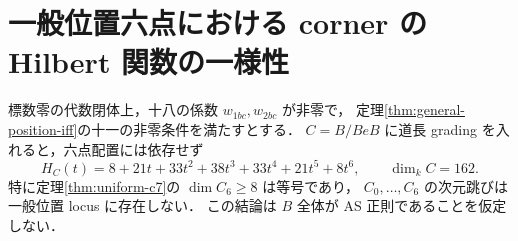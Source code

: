 \section{一般位置六点における corner の Hilbert 関数の一様性}
\label{sec:hilbert-constant}
\begin{theorem}\label{thm:hilbert-constant}
標数零の代数閉体上，十八の係数 $w_{1bc},w_{2bc}$ が非零で，
定理\ref{thm:general-position-iff}の十一の非零条件を満たすとする．
$C=B/BeB$ に道長 grading を入れると，六点配置には依存せず
\[
 \boxed{H_C(t)=8+21t+33t^2+38t^3+33t^4+21t^5+8t^6,\qquad
       \dim_k C=162.}
\]
特に定理\ref{thm:uniform-c7}の $\dim C_6\ge8$ は等号であり，
$C_0,\ldots,C_6$ の次元跳びは一般位置 locus に存在しない．
この結論は $B$ 全体が AS 正則であることを仮定しない．
\end{theorem}

